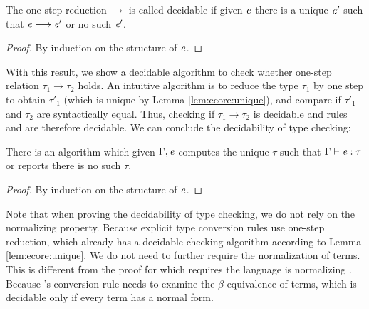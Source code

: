 \begin{lem}\label{lem:ecore:unique}
	The one-step reduction $ \longrightarrow $ is called decidable if 
given $\mathit{e}$ there is a unique $\mathit{e'}$ such that $\mathit{e}  \longrightarrow  \mathit{e'}$ or no such $\mathit{e'}$.
\end{lem}

\begin{proof}
	By induction on the structure of $\mathit{e}$.
\end{proof}

With this result, we show a decidable algorithm to check whether one-step
relation $\tau_{{\mathrm{1}}}  \longrightarrow  \tau_{{\mathrm{2}}}$ holds. An intuitive algorithm is to reduce the type
$\tau_{{\mathrm{1}}}$ by one step to obtain $\tau'_{{\mathrm{1}}}$ (which is unique by Lemma
\ref{lem:ecore:unique}), and compare if $\tau'_{{\mathrm{1}}}$ and $\tau_{{\mathrm{2}}}$ are
syntactically equal. Thus, checking if $\tau_{{\mathrm{1}}}  \longrightarrow  \tau_{{\mathrm{2}}}$ is decidable and rules
 and  are therefore decidable. We can
conclude the decidability of type checking:

\begin{thm}\label{lem:ecore:decide}
	There is an algorithm which given $\Gamma, \mathit{e}$ computes the unique
$\tau$ such that $\Gamma  \vdash  \mathit{e}  :  \tau$ or reports there is no such $\tau$.
\end{thm}

\begin{proof}
	By induction on the structure of $\mathit{e}$.
\end{proof}

Note that when proving the decidability of type checking, we do not rely on the
normalizing property. Because explicit type conversion rules use one-step
reduction, which already has a decidable checking algorithm according to Lemma
\ref{lem:ecore:unique}. We do not need to further require the normalization of
terms. This is different from the proof for \cc which requires the language is
normalizing \cite{pts:normalize}. Because \cc's conversion rule needs to
examine the $\beta$-equivalence of terms, which is decidable only if every term
has a normal form.

